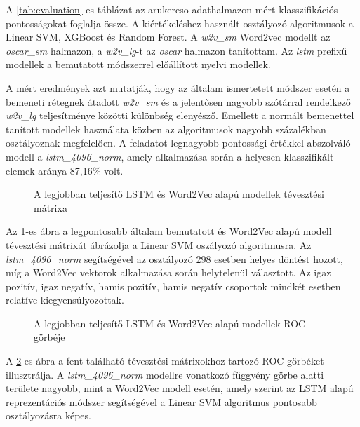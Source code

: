 A \ref{tab:evaluation}-es táblázat az arukereso adathalmazon mért klasszifikációs pontosságokat foglalja össze. A kiértékeléshez használt osztályozó algoritmusok a Linear SVM, XGBoost és Random Forest. A \textit{w2v\_sm} Word2vec modellt az \textit{oscar\_sm} halmazon, a \textit{w2v\_lg}-t az \textit{oscar} halmazon tanítottam. Az \textit{lstm} prefixű modellek a bemutatott módszerrel előállított nyelvi modellek.

A mért eredmények azt mutatják, hogy az általam ismertetett módszer esetén a bemeneti rétegnek átadott \textit{w2v\_sm} és a jelentősen nagyobb szótárral rendelkező \textit{w2v\_lg} teljesítménye közötti különbség elenyésző. Emellett a normált bemenettel tanított modellek használata közben az algoritmusok nagyobb százalékban osztályoznak megfelelően. A feladatot legnagyobb pontossági értékkel abszolváló modell a \textit{lstm\_4096\_norm}, amely alkalmazása során a helyesen klasszifikált elemek aránya 87,16\% volt.

\begin{figure}[H]
	\centering
	\caption{A legjobban teljesítő LSTM és Word2Vec alapú modellek tévesztési mátrixa}
	\label{fig:matrix}
\end{figure}

Az \ref{fig:matrix}-es ábra a legpontosabb általam bemutatott és Word2Vec alapú modell tévesztési mátrixát ábrázolja a Linear SVM oszályozó algoritmusra. Az \textit{lstm\_4096\_norm} segítségével az osztályozó 298 esetben helyes döntést hozott, míg a Word2Vec vektorok alkalmazása során helytelenül választott. Az igaz pozitív, igaz negatív, hamis pozitív, hamis negatív csoportok mindkét esetben relatíve kiegyensúlyozottak.

\begin{figure}[H]
	\centering
	\caption{A legjobban teljesítő LSTM és Word2Vec alapú modellek ROC görbéje}
	\label{fig:roc}
\end{figure}

A \ref{fig:roc}-es ábra a fent található tévesztési mátrixokhoz tartozó ROC görbéket illusztrálja. A \textit{lstm\_4096\_norm} modellre vonatkozó függvény görbe alatti területe nagyobb, mint a Word2Vec modell esetén, amely szerint az LSTM alapú reprezentációs módszer segítségével a Linear SVM algoritmus pontosabb osztályozásra képes.















